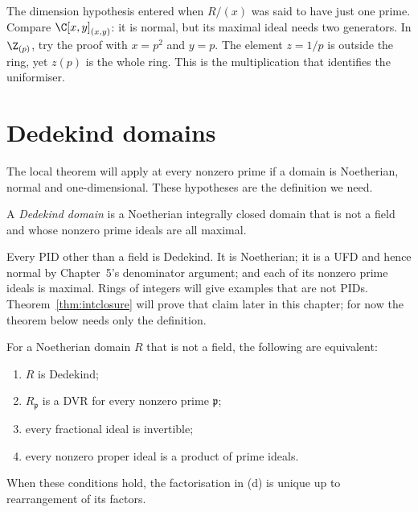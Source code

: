 \begin{think}
The dimension hypothesis entered when $R/(x)$ was said to have just one prime. Compare $\C[x,y]_{(x,y)}$: it is normal, but its maximal ideal needs two generators. In $\Z_{(p)}$, try the proof with $x=p^2$ and $y=p$. The element $z=1/p$ is outside the ring, yet $z(p)$ is the whole ring. This is the multiplication that identifies the uniformiser.
\end{think}

\section{Dedekind domains}

The local theorem will apply at every nonzero prime if a domain is Noetherian, normal and one-dimensional. These hypotheses are the definition we need.

\begin{definition}\label{def:dedekind}
A \emph{Dedekind domain} is a Noetherian integrally closed domain that is not a field and whose nonzero prime ideals are all maximal.
\end{definition}

Every PID other than a field is Dedekind. It is Noetherian; it is a UFD and hence normal by Chapter~5's denominator argument; and each of its nonzero prime ideals is maximal. Rings of integers will give examples that are not PIDs. Theorem~\ref{thm:intclosure} will prove that claim later in this chapter; for now the theorem below needs only the definition.

\begin{theorem}[Noether, 1927]\label{thm:dedekind}
For a Noetherian domain $R$ that is not a field, the following are equivalent:
\begin{enumerate}[label=(\alph*)]
\item $R$ is Dedekind;
\item $R_{\mathfrak p}$ is a DVR for every nonzero prime $\mathfrak p$;
\item every fractional ideal is invertible;
\item every nonzero proper ideal is a product of prime ideals.
\end{enumerate}
When these conditions hold, the factorisation in (d) is unique up to rearrangement of its factors.
\end{theorem}

